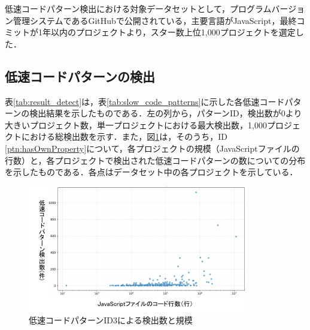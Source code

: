 \documentclass[submit,techrep,noauthor]{ipsj}
\begin{document}
低速コードパターン検出における対象データセットとして，プログラムバージョン管理システムであるGitHubで公開されている，主要言語がJavaScript，最終コミットが1年以内のプロジェクトより，スター数上位1,000プロジェクトを選定した．

\subsection{低速コードパターンの検出}

表\ref{tab:result_detect}は，表\ref{tab:slow_code_patterns}に示した各低速コードパターンの検出結果を示したものである．左の列から，パターンID，検出数が0より大きいプロジェクト数，単一プロジェクトにおける最大検出数，1,000プロジェクトにおける総検出数を示す．また，図\ref{fig:plot_id3}は，そのうち，ID \ref{ptn:hasOwnProperty}について，各プロジェクトの規模（JavaScriptファイルの行数）と，各プロジェクトで検出された低速コードパターンの数についての分布を示したものである．各点はデータセット中の各プロジェクトを示している．

\begin{table}[h!]
    \centering
    \caption{検出結果}
    \label{tab:result_detect}
\end{table}

\begin{figure}[h!]
    \centering
    \includegraphics[width=0.9\linewidth]{./Noguchi_fig/ID3_222_log.pdf}
    \caption{低速コードパターンID3による検出数と規模}
    \label{fig:plot_id3}
\end{figure}
\end{document}
